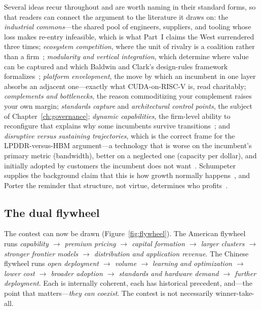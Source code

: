 Several ideas recur throughout and are worth naming in their standard forms, so that readers can connect the argument to the literature it draws on: the \emph{industrial commons}---the shared pool of engineers, suppliers, and tooling whose loss makes re-entry infeasible, which is what Part~I claims the West surrendered three times; \emph{ecosystem competition}, where the unit of rivalry is a coalition rather than a firm~\cite{jacobides2018}; \emph{modularity and vertical integration}, which determine where value can be captured and which Baldwin and Clark's design-rules framework formalizes~\cite{baldwin2000}; \emph{platform envelopment}, the move by which an incumbent in one layer absorbs an adjacent one---exactly what CUDA-on-RISC-V is, read charitably; \emph{complements and bottlenecks}, the reason commoditizing your complement raises your own margin; \emph{standards capture} and \emph{architectural control points}, the subject of Chapter~\ref{ch:governance}; \emph{dynamic capabilities}, the firm-level ability to reconfigure that explains why some incumbents survive transitions~\cite{teece1997}; and \emph{disruptive versus sustaining trajectories}, which is the correct frame for the LPDDR-versus-HBM argument---a technology that is worse on the incumbent's primary metric (bandwidth), better on a neglected one (capacity per dollar), and initially adopted by customers the incumbent does not want~\cite{christensen1997}. Schumpeter supplies the background claim that this is how growth normally happens~\cite{schumpeter1942}, and Porter the reminder that structure, not virtue, determines who profits~\cite{porter1980}.

\subsection{The dual flywheel}
\label{sec:flywheels}

The contest can now be drawn (Figure~\ref{fig:flywheel}). The American flywheel runs \emph{capability $\rightarrow$ premium pricing $\rightarrow$ capital formation $\rightarrow$ larger clusters $\rightarrow$ stronger frontier models $\rightarrow$ distribution and application revenue}. The Chinese flywheel runs \emph{open deployment $\rightarrow$ volume $\rightarrow$ learning and optimization $\rightarrow$ lower cost $\rightarrow$ broader adoption $\rightarrow$ standards and hardware demand $\rightarrow$ further deployment}. Each is internally coherent, each has historical precedent, and---the point that matters---\emph{they can coexist}. The contest is not necessarily winner-take-all.

